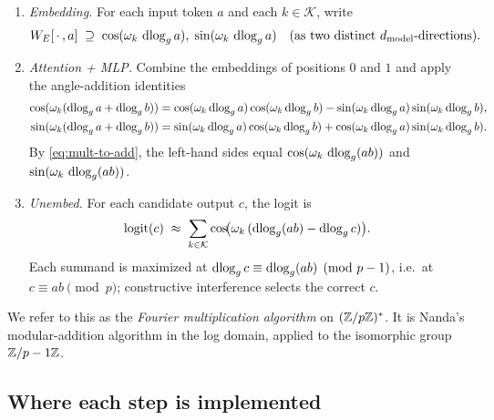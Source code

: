 \begin{enumerate}[leftmargin=2em]
  \item \emph{Embedding.}  For each input token $a$ and each $k \in
        \mathcal{K}$, write
        \begin{equation}
          W_E[\,\cdot\,, a] \;\supseteq\;
            \cos(\omega_k\, \operatorname{dlog}_g a), \;
            \sin(\omega_k\, \operatorname{dlog}_g a)
          \quad\text{(as two distinct $d_{\text{model}}$-directions).}
          \label{eq:embed-claim}
        \end{equation}
  \item \emph{Attention + MLP.}  Combine the embeddings of positions $0$ and
        $1$ and apply the angle-addition identities
        \begin{align}
          \cos(\omega_k(\operatorname{dlog}_g a + \operatorname{dlog}_g b))
          &= \cos(\omega_k \operatorname{dlog}_g a)\cos(\omega_k \operatorname{dlog}_g b)
            - \sin(\omega_k \operatorname{dlog}_g a)\sin(\omega_k \operatorname{dlog}_g b),
            \label{eq:trig-cos} \\
          \sin(\omega_k(\operatorname{dlog}_g a + \operatorname{dlog}_g b))
          &= \sin(\omega_k \operatorname{dlog}_g a)\cos(\omega_k \operatorname{dlog}_g b)
            + \cos(\omega_k \operatorname{dlog}_g a)\sin(\omega_k \operatorname{dlog}_g b).
            \label{eq:trig-sin}
        \end{align}
        By \eqref{eq:mult-to-add}, the left-hand sides equal
        $\cos(\omega_k\, \operatorname{dlog}_g(ab))$ and $\sin(\omega_k\, \operatorname{dlog}_g(ab))$.
  \item \emph{Unembed.}  For each candidate output $c$, the logit is
        \begin{equation}
          \mathrm{logit}(c)
          \;\approx\;
          \sum_{k \in \mathcal{K}}
            \cos\!\bigl(\omega_k\, (\operatorname{dlog}_g(ab) - \operatorname{dlog}_g c)\bigr).
          \label{eq:logit-formula}
        \end{equation}
        Each summand is maximized at $\operatorname{dlog}_g c \equiv \operatorname{dlog}_g(ab) \pmod{p-1}$,
        i.e.\ at $c \equiv a b \pmod p$; constructive interference selects the
        correct $c$.
\end{enumerate}

We refer to this as the \emph{Fourier multiplication algorithm} on $(\mathbb{Z}/p\mathbb{Z})^*$.
It is Nanda's modular-addition algorithm in the log domain, applied to the
isomorphic group $\mathbb{Z}/p-1\mathbb{Z}$.

\subsection{Where each step is implemented}
\label{subsec:implementation}

